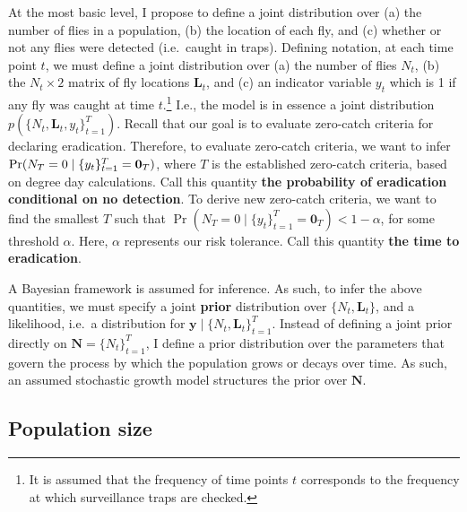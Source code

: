\documentclass[
  oneside]{book}
\begin{document}
At the most basic level, I propose to define a joint distribution over (a) the number of flies in a population, (b) the location of each fly, and (c) whether or not any flies were detected (i.e.~caught in traps). Defining notation, at each time point \(t\), we must define a joint distribution over (a) the number of flies \(N_t\), (b) the \(N_t \times 2\) matrix of fly locations \(\mathbf L_t\), and (c) an indicator variable \(y_t\) which is 1 if any fly was caught at time \(t\).\footnote{It is assumed that the frequency of time points \(t\) corresponds to the frequency at which surveillance traps are checked.} I.e., the model is in essence a joint distribution \(p(\{N_t, \mathbf L_t, y_t\}_{t=1}^T)\). Recall that our goal is to evaluate zero-catch criteria for declaring eradication. Therefore, to evaluate zero-catch criteria, we want to infer \(\Pr(N_T = 0 \mid \mathbf \{y_t\}_{t=1}^T = \mathbf 0_T)\), where \(T\) is the established zero-catch criteria, based on degree day calculations. Call this quantity \textbf{the probability of eradication conditional on no detection}. To derive new zero-catch criteria, we want to find the smallest \(T\) such that \(\Pr(N_T = 0 \mid \{y_t\}_{t=1}^T = \mathbf 0_T) < 1-\alpha\), for some threshold \(\alpha\). Here, \(\alpha\) represents our risk tolerance. Call this quantity \textbf{the time to eradication}.

A Bayesian framework is assumed for inference. As such, to infer the above quantities, we must specify a joint \textbf{prior} distribution over \(\{N_t, \mathbf L_t\}\), and a likelihood, i.e.~a distribution for \(\mathbf y \mid \{N_t, \mathbf L_t\}_{t=1}^T\). Instead of defining a joint prior directly on \(\mathbf N = \{N_t\}_{t=1}^T\), I define a prior distribution over the parameters that govern the process by which the population grows or decays over time. As such, an assumed stochastic growth model structures the prior over \(\mathbf N\).

\hypertarget{population-size}{%
\subsection{Population size}\label{population-size}}
\end{document}
